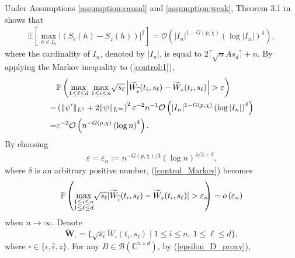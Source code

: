 \documentclass{amsart}
\begin{document}
Under Assumptions \ref{assumption:causal} and \ref{assumption:weak}, Theorem 3.1 in \cite{wu2025uncertainty}
shows that
\begin{align}\label{cited_result:Wu}
\mathbb{E}\left[\underset{h\in I_{n}}{\max}\left|
\left(S_{\widehat{\epsilon}}\left(h\right) -S_{z}\left(h\right)\right)\right|^{2}\right]
=\mathcal{O}\left(|I_{n}|^{1-G(p,\chi)}\left(\log|I_{n}|\right)^{4}\right),
\end{align}
where the cardinality of $I_{n}$, denoted by $|I_{n}|$, is equal to $2\lceil \sqrt{n}As_{d}\rceil+n$.
By applying the Markov inequality to (\ref{control:1}),
\begin{align}\notag
&\mathbb{P}\left(\underset{1\leq \ell \leq d}{\max}\ \underset{1\leq i\leq n}{\max}\sqrt{s_{\ell}}\left|\widetilde{W}_{\widehat{\epsilon}}(t_{i},s_{\ell})
-\widetilde{W}_{z}(t_{i},s_{\ell})\right|>\varepsilon\right)
\\\notag=&
\left(\|\psi'\|_{L^{1}}+2\|\psi\|_{L^{\infty}}\right)^{2}\varepsilon^{-2}n^{-1}\mathcal{O}\left(|I_{n}|^{1-G(p,\chi)}\left(\log|I_{n}|\right)^{4}\right)
\\\label{control_Markov}=&
\varepsilon^{-2}\mathcal{O}\left(n^{-G(p,\chi)}\left(\log n\right)^{4}\right).
\end{align}
By choosing
\begin{align*}
\varepsilon =\varepsilon_{n}:= n^{-G(p,\chi)/3}(\log n)^{4/3+\delta},
\end{align*}
where $\delta$ is an arbitrary positive number, (\ref{control_Markov}) becomes
\begin{align}\label{control:3}
\mathbb{P}\left(\underset{\begin{subarray}{c}
1\leq i\leq n \\ 1\leq \ell \leq d\end{subarray}}{\max}\sqrt{s_{\ell}}|\widetilde{W}_{\widehat{\epsilon}}(t_{i},s_{\ell})
-\widetilde{W}_{z}(t_{i},s_{\ell})|>\varepsilon_{n}\hspace{-0.15cm}\right)
=o\left(\varepsilon_{n}\right)
\end{align}
when $n\rightarrow\infty$.
Denote
$$
\widetilde{\mathbf{W}}_{\square}=\{\sqrt{s_{\ell}}\widetilde{W}_{\square}(t_{i},s_{\ell})\mid 1\leq i\leq n,\ 1\leq \ell \leq d\},
$$
where $\square\in \{\epsilon,\widehat{\epsilon},z\}$.
For any $B\in \mathcal{B}(\mathbb{C}^{n\times d})$, by (\ref{epsilon_D_proxy}),
\end{document}
